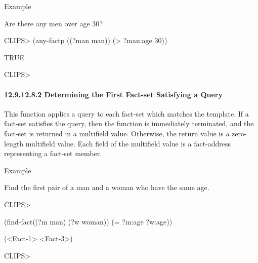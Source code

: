 \documentclass[letterpaper,10pt,english]{sphinxmanual}
\begin{document}

\begin{sphinxVerbatim}[commandchars=\\\{\}]
  
\end{sphinxVerbatim}

Example

Are there any men over age 30?

CLIPS\textgreater{} (any-factp ((?man man)) (\textgreater{} ?man:age 30))

TRUE

CLIPS\textgreater{}


\paragraph{12.9.12.8.2 Determining the First Fact-set Satisfying a Query}
\label{\detokenize{actions:determining-the-first-fact-set-satisfying-a-query}}
This function applies a query to each fact-set which matches the
template. If a fact-set satisfies the query, then the function is
immediately terminated, and the fact-set is returned in a multifield
value. Otherwise, the return value is a zero-length multifield value.
Each field of the multifield value is a fact-address representing a
fact-set member.


\begin{sphinxVerbatim}[commandchars=\\\{\}]
  
\end{sphinxVerbatim}

Example

Find the first pair of a man and a woman who have the same age.

CLIPS\textgreater{}

(find-fact((?m man) (?w woman)) (= ?m:age ?w:age))

(\textless{}Fact-1\textgreater{} \textless{}Fact-3\textgreater{})

CLIPS\textgreater{}
\end{document}
